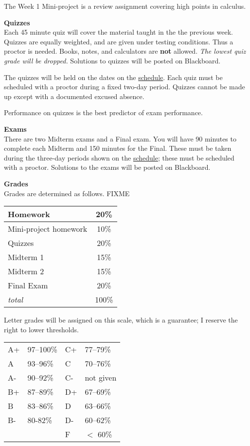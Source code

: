 \documentclass[12pt]{article}
\renewcommand{\emph}[1]{\textsf{\textbf{#1}}}
\newcommand{\localhead}[1]{\par\smallskip\textbf{#1}\nobreak\\}%
\def\heading#1{\localhead{\large\emph{#1}}}
\def\subheading#1{\localhead{\emph{#1}}}
\begin{document}
The Week 1 Mini-project is a review assignment covering high points in calculus.

\subheading{Quizzes}
Each 45 minute quiz will cover the material taught in the the previous week.  Quizzes are equally weighted, and are given under testing conditions.  Thus a proctor is needed.  Books, notes, and calculators are \emph{not} allowed.  \textsl{The lowest quiz grade will be dropped.}  Solutions to quizzes will be posted on Blackboard.

The quizzes will be held on the dates on the \href{https://bueler.github.io/math302/assets/general/F23/schedule.pdf}{schedule}.  Each quiz must be scheduled with a proctor during a fixed two-day period.  Quizzes cannot be made up except with a documented excused absence.

Performance on quizzes is the best predictor of exam performance.

\subheading{Exams}
There are two Midterm exams and a Final exam.  You will have 90 minutes to complete each Midterm and 150 minutes for the Final.  These must be taken during the three-day periods shown on the \href{https://bueler.github.io/math302/assets/general/F23/schedule.pdf}{schedule}; these must be scheduled with a proctor.  Solutions to the exams will be posted on Blackboard.


\heading{Grades}
Grades are determined as follows.  FIXME
 
\begin{multicols}{2}

\begin{tabular}{|l|c|}
\hline
Homework & 20\%\\
\hline
Mini-project homework & 10\% \\
\hline
Quizzes& 20\% \\
\hline
Midterm 1 & 15\% \\
\hline
Midterm 2 & 15\%  \\
\hline
Final Exam& 20\% \\
\hline
\textsl{total} & 100\%\\
\hline
\end{tabular}

\vskip 25pt

Letter grades will be assigned on this scale, which is a guarantee; I reserve the right to lower thresholds. 

\begin{tabular}{llll}
A+ & 97--100\% \quad\strut & C+ & 77--79\% \\
A & 93--96\% &  C & 70--76\% \\
A- & 90--92\% & C- & not given \\
B+ & 87--89\% & D+ & 67--69\% \\
B &  83--86\% & D & 63--66\% \\
B- & 80-82\% & D- & 60--62\% \\
 & & F  & $<$ 60\%
\end{tabular}
\end{multicols}
\end{document}
